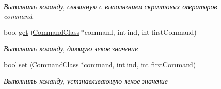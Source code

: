 \begin{DoxyCompactItemize}
\begin{DoxyCompactList}\small\item\em Выполнить команду, связанную с выполнением скриптовых операторов command. \end{DoxyCompactList}\item 
bool \hyperlink{class_system_class_a5ff4f256861285812190f780dcddff01}{get} (\hyperlink{class_command_class}{Command\+Class} $\ast$command, int ind, int first\+Command)
\begin{DoxyCompactList}\small\item\em Выполнить команду, дающую некое значение \end{DoxyCompactList}\item 
bool \hyperlink{class_system_class_a2c069c91c63a13da2944a468837d2aa8}{set} (\hyperlink{class_command_class}{Command\+Class} $\ast$command, int ind, int first\+Command)
\begin{DoxyCompactList}\small\item\em Выполнить команду, устанавливающую некое значение \end{DoxyCompactList}\end{DoxyCompactItemize}
